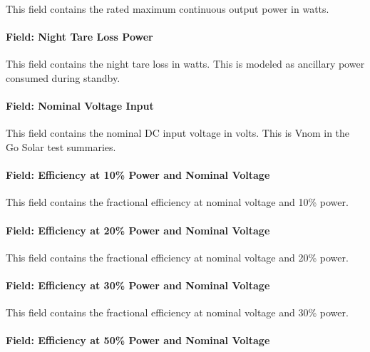 This field contains the rated maximum continuous output power in watts.

\paragraph{Field: Night Tare Loss Power}\label{field-night-tare-loss-power}

This field contains the night tare loss in watts. This is modeled as ancillary power consumed during standby.

\paragraph{Field: Nominal Voltage Input}\label{field-nominal-voltage-input}

This field contains the nominal DC input voltage in volts. This is Vnom in the Go Solar test summaries.

\paragraph{Field: Efficiency at 10\% Power and Nominal Voltage}\label{field-efficiency-at-10-power-and-nominal-voltage}

This field contains the fractional efficiency at nominal voltage and 10\% power.

\paragraph{Field: Efficiency at 20\% Power and Nominal Voltage}\label{field-efficiency-at-20-power-and-nominal-voltage}

This field contains the fractional efficiency at nominal voltage and 20\% power.

\paragraph{Field: Efficiency at 30\% Power and Nominal Voltage}\label{field-efficiency-at-30-power-and-nominal-voltage}

This field contains the fractional efficiency at nominal voltage and 30\% power.

\paragraph{Field: Efficiency at 50\% Power and Nominal Voltage}\label{field-efficiency-at-50-power-and-nominal-voltage}

